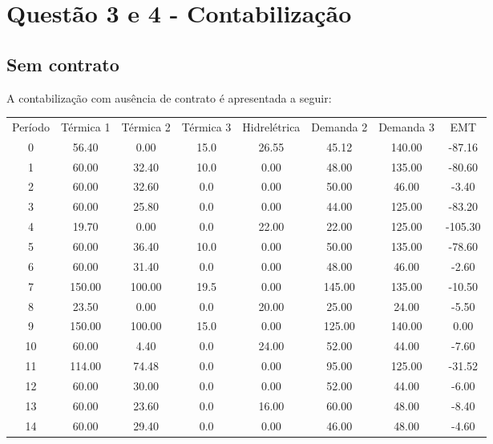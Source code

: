 \documentclass[a4paper,12pt,twoside]{article}
\begin{document}
\newpage

\section{Questão 3 e 4 - Contabilização}
\subsection{Sem contrato}
A contabilização com ausência de contrato é apresentada a seguir:

\begin{center}
    \begin{tabular}{ c c c c c c c c }
        Período & Térmica 1  & Térmica 2  & Térmica 3  & Hidrelétrica  & Demanda 2  & Demanda 3      & EMT \\
        0    & 56.40     & 0.00     & 15.0  & 26.55   & 45.12  & 140.00  & -87.16 \\
        1    & 60.00    & 32.40     & 10.0   & 0.00   & 48.00  & 135.00  & -80.60 \\
        2    & 60.00    & 32.60      & 0.0   & 0.00   & 50.00   & 46.00   & -3.40 \\
        3    & 60.00    & 25.80      & 0.0   & 0.00   & 44.00  & 125.00  & -83.20 \\
        4    & 19.70     & 0.00      & 0.0  & 22.00   & 22.00  & 125.00 & -105.30 \\
        5    & 60.00    & 36.40     & 10.0   & 0.00   & 50.00  & 135.00  & -78.60 \\
        6    & 60.00    & 31.40      & 0.0   & 0.00   & 48.00   & 46.00   & -2.60 \\
        7   & 150.00   & 100.00     & 19.5   & 0.00  & 145.00  & 135.00  & -10.50 \\
        8    & 23.50     & 0.00      & 0.0  & 20.00   & 25.00   & 24.00   & -5.50 \\
        9   & 150.00   & 100.00     & 15.0   & 0.00  & 125.00  & 140.00    & 0.00 \\
        10   & 60.00     & 4.40      & 0.0  & 24.00   & 52.00   & 44.00   & -7.60 \\
        11  & 114.00    & 74.48      & 0.0   & 0.00   & 95.00  & 125.00  & -31.52 \\
        12   & 60.00    & 30.00      & 0.0   & 0.00   & 52.00   & 44.00   & -6.00 \\
        13   & 60.00    & 23.60      & 0.0  & 16.00   & 60.00   & 48.00   & -8.40 \\
        14   & 60.00    & 29.40      & 0.0   & 0.00   & 46.00   & 48.00   & -4.60 \\

\end{tabular}
\end{center}
\end{document}
